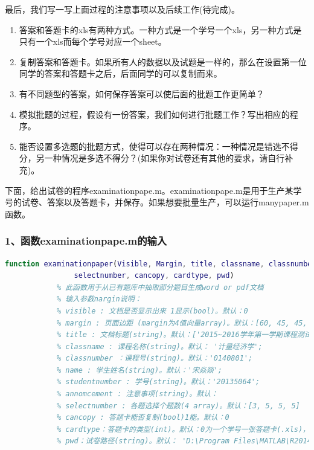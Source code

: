         \par
        最后，我们写一写上面过程的注意事项以及后续工作(待完成)。
        \begin{enumerate}
          \item 答案和答题卡的xls有两种方式。一种方式是一个学号一个xls，另一种方式是只有一个xls而每个学号对应一个sheet。
          \item 复制答案和答题卡。如果所有人的数据以及试题是一样的，那么在设置第一位同学的答案和答题卡之后，后面同学的可以复制而来。
          \item 有不同题型的答案，如何保存答案可以使后面的批题工作更简单？
          \item 模拟批题的过程，假设有一份答案，我们如何进行批题工作？写出相应的程序。
          \item 能否设置多选题的批题方式，使得可以存在两种情况：一种情况是错选不得分，另一种情况是多选不得分？(如果你对试卷还有其他的要求，请自行补充)。
        \end{enumerate}
        \par
        下面，给出试卷的程序examinationpape.m。examinationpape.m是用于生产某学号的试卷、答案以及答题卡，并保存。如果想要批量生产，可以运行manypaper.m函数。
        \subsubsection{1、函数examinationpape.m的输入}
            \begin{lstlisting}[language=Matlab]
            function examinationpaper(Visible, Margin, title, classname, classnumber, name, studentnumber, annomcement,...
                selectnumber, cancopy, cardtype, pwd)
            % 此函数用于从已有题库中抽取部分题目生成word or pdf文档
            % 输入参数nargin说明：
            % visible : 文档是否显示出来 1显示(bool)。默认：0
            % margin : 页面边距 (margin为4值向量array)。默认：[60, 45, 45, 45];
            % title : 文档标题(string)。默认：['2015~2016学年第一学期课程测试试卷(第2次测试)'];
            % classname : 课程名称(string)。默认： '计量经济学';
            % classnumber ：课程号(string)。默认：'0140801';
            % name : 学生姓名(string)。默认：'宋焱燚';
            % studentnumber : 学号(string)。默认：'20135064';
            % annomcement : 注意事项(string)。默认：
            % selectnumber : 各题选择个题数(4 array)。默认：[3, 5, 5, 5]
            % cancopy : 答题卡能否复制(bool)1能。默认：0
            % cardtype：答题卡的类型(int)。默认：0为一个学号一张答题卡(.xls)，1表示所有答题卡在一个.xls中
            % pwd：试卷路径(string)。默认： 'D:\Program Files\MATLAB\R2014a\work\20计量经济作业解\生成的试卷';
            \end{lstlisting}
